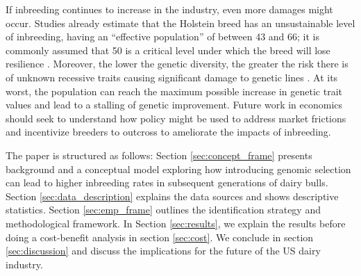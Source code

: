 \documentclass[12pt,letterpaper]{article}
\begin{document}
If inbreeding continues to increase in the industry, even more damages might occur.
Studies already estimate that the Holstein breed has an unsustainable level of inbreeding, having an ``effective population'' of between 43 and 66; it is commonly assumed that 50 is a critical level under which the breed will lose resilience \citep{Makanjuola2020}.
Moreover, the lower the genetic diversity, the greater the risk there is of unknown recessive traits causing significant damage to genetic lines \citep{Cole2011, Lozada2024}. 
At its worst, the population can reach the maximum possible increase in genetic trait values and lead to a stalling of genetic improvement.
Future work in economics should seek to understand how policy might be used to address market frictions and incentivize breeders to outcross to ameliorate the impacts of inbreeding.


The paper is structured as follows: Section \ref{sec:concept_frame} presents background and a conceptual model exploring how introducing genomic selection can lead to higher inbreeding rates in subsequent generations of dairy bulls. Section \ref{sec:data_description} explains the data sources and shows descriptive statistics. Section \ref{sec:emp_frame} outlines the identification strategy and methodological framework. In Section \ref{sec:results}, we explain the results before doing a cost-benefit analysis in section \ref{sec:cost}. We conclude in section \ref{sec:discussion} and discuss the implications for the future of the US dairy industry.

\end{document}
